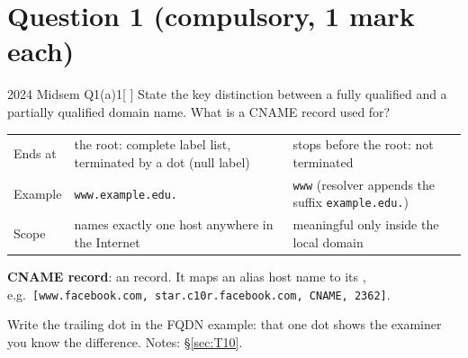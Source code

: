 \section{Question 1 (compulsory, 1 mark each)}

\begin{question}{2024 Midsem Q1(a)}{1}[ ]
State the key distinction between a fully qualified and a partially qualified domain name. What is a CNAME record used for?
\end{question}
\label{q:MS2024-1a}
\begin{solution}
\begin{tabularx}{\linewidth}{L{20mm}YY}\toprule
\thead{} &  & \\\midrule
Ends at & the root: complete label list, terminated by a dot (null label) & stops before the root: not terminated\\
Example & \texttt{www.example.edu.} & \texttt{www} (resolver appends the suffix \texttt{example.edu.})\\
Scope & names exactly one host anywhere in the Internet & meaningful only inside the local domain\\\bottomrule
\end{tabularx}

\smallskip
\textbf{CNAME record}: an  record. It maps an alias host name to its ,
e.g.\ \texttt{[www.facebook.com, star.c10r.facebook.com, CNAME, 2362]}. 
\end{solution}
\begin{examtip}Write the trailing dot in the FQDN example: that one dot shows the examiner you know the difference. Notes: \S\ref{sec:T10}.\end{examtip}

